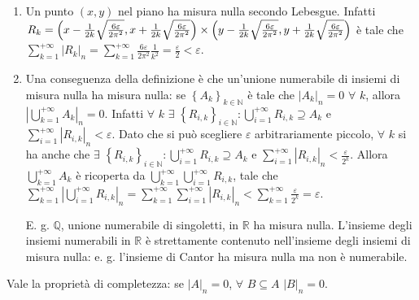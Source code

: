 \documentclass{article}
\begin{document}
\begin{enumerate}
\item Un punto $\left( x,y\right) $ nel piano ha misura nulla secondo
Lebesgue. Infatti $R_{k}=\left( x-\frac{1}{2k}\sqrt{\frac{6\varepsilon }{%
2\pi ^{2}}},x+\frac{1}{2k}\sqrt{\frac{6\varepsilon }{2\pi ^{2}}}\right)
\times \left( y-\frac{1}{2k}\sqrt{\frac{6\varepsilon }{2\pi ^{2}}},y+\frac{1%
}{2k}\sqrt{\frac{6\varepsilon }{2\pi ^{2}}}\right) $ \`{e} tale che $%
\sum_{k=1}^{+\infty }\left\vert R_{k}\right\vert _{n}=\sum_{k=1}^{+\infty }%
\frac{6\varepsilon }{2\pi ^{2}}\frac{1}{k^{2}}=\frac{\varepsilon }{2}%
<\varepsilon $.

\item Una conseguenza della definizione \`{e} che un'unione numerabile di
insiemi di misura nulla ha misura nulla: se $\left\{ A_{k}\right\} _{k\in 
\mathbb{N}
}$ \`{e} tale che $\left\vert A_{k}\right\vert _{n}=0$ $\forall $ $k$,
allora $\left\vert \bigcup_{k=1}^{+\infty }A_{k}\right\vert _{n}=0$. Infatti 
$\forall $ $k$ $\exists $ $\left\{ R_{i,k}\right\} _{i\in 
\mathbb{N}
}:\bigcup_{i=1}^{+\infty }R_{i,k}\supseteq A_{k}$ e $\sum_{i=1}^{+\infty
}\left\vert R_{i,k}\right\vert _{n}<\varepsilon $. Dato che si pu\`{o}
scegliere $\varepsilon $ arbitrariamente piccolo, $\forall $ $k$ si ha anche
che $\exists $ $\left\{ R_{i,k}\right\} _{i\in 
\mathbb{N}
}:\bigcup_{i=1}^{+\infty }R_{i,k}\supseteq A_{k}$ e $\sum_{i=1}^{+\infty
}\left\vert R_{i,k}\right\vert _{n}<\frac{\varepsilon }{2^{k}}$. Allora $%
\bigcup_{k=1}^{+\infty }A_{k}$ \`{e} ricoperta da $\bigcup_{k=1}^{+\infty
}\bigcup_{i=1}^{+\infty }R_{i,k}$, tale che $\sum_{k=1}^{+\infty }\left\vert
\bigcup_{i=1}^{+\infty }R_{i,k}\right\vert _{n}=\sum_{k=1}^{+\infty
}\sum_{i=1}^{+\infty }\left\vert R_{i,k}\right\vert _{n}<\sum_{k=1}^{+\infty
}\frac{\varepsilon }{2^{k}}=\varepsilon $.

E. g. $%
\mathbb{Q}
$, unione numerabile di singoletti, in $%
\mathbb{R}
$ ha misura nulla. L'insieme degli insiemi numerabili in $%
\mathbb{R}
$ \`{e} strettamente contenuto nell'insieme degli insiemi di misura nulla:
e. g. l'insieme di Cantor ha misura nulla ma non \`{e} numerabile.
\end{enumerate}

Vale la propriet\`{a} di completezza: se $\left\vert A\right\vert _{n}=0$, $%
\forall $ $B\subseteq A$ $\left\vert B\right\vert _{n}=0$.
\end{document}
